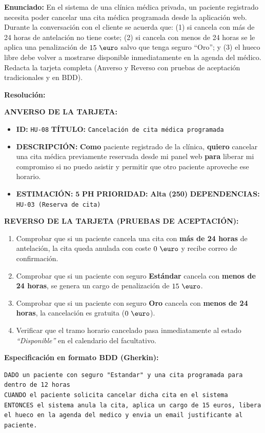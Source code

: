 \begin{ejercicio}
\textbf{Enunciado:} En el sistema de una clínica médica privada, un paciente registrado necesita poder cancelar una cita médica programada desde la aplicación web. Durante la conversación con el cliente se acuerda que: (1) si cancela con más de 24 horas de antelación no tiene coste; (2) si cancela con menos de 24 horas se le aplica una penalización de $15\text{ \euro}$ salvo que tenga seguro ``Oro''; y (3) el hueco libre debe volver a mostrarse disponible inmediatamente en la agenda del médico. Redacta la tarjeta completa (Anverso y Reverso con pruebas de aceptación tradicionales y en BDD).

\vspace{4pt}
\textbf{Resolución:}
\begin{tarjetahu}
\textbf{ANVERSO DE LA TARJETA:}
\begin{itemize}[itemsep=1pt]
    \item \textbf{ID:} \texttt{HU-08} \hfill \textbf{TÍTULO:} \texttt{Cancelación de cita médica programada}
    \item \textbf{DESCRIPCIÓN:} \textbf{Como} paciente registrado de la clínica, \textbf{quiero} cancelar una cita médica previamente reservada desde mi panel web \textbf{para} liberar mi compromiso si no puedo asistir y permitir que otro paciente aproveche ese horario.
    \item \textbf{ESTIMACIÓN:} $\mathbf{5\text{ PH}}$ \hfill \textbf{PRIORIDAD:} \textbf{Alta (250)} \hfill \textbf{DEPENDENCIAS:} \texttt{HU-03 (Reserva de cita)}
\end{itemize}
\tcbline
\textbf{REVERSO DE LA TARJETA (PRUEBAS DE ACEPTACIÓN):}
\begin{enumerate}[label=\textbf{\arabic*.}, itemsep=2pt]
    \item Comprobar que si un paciente cancela una cita con \textbf{más de 24 horas} de antelación, la cita queda anulada con coste $0\text{ \euro}$ y recibe correo de confirmación.
    \item Comprobar que si un paciente con seguro \textbf{Estándar} cancela con \textbf{menos de 24 horas}, se genera un cargo de penalización de $15\text{ \euro}$.
    \item Comprobar que si un paciente con seguro \textbf{Oro} cancela con \textbf{menos de 24 horas}, la cancelación es gratuita ($0\text{ \euro}$).
    \item Verificar que el tramo horario cancelado pasa inmediatamente al estado \textit{``Disponible''} en el calendario del facultativo.
\end{enumerate}
\textbf{Especificación en formato BDD (Gherkin):}
\begin{lstlisting}
DADO un paciente con seguro "Estandar" y una cita programada para dentro de 12 horas
CUANDO el paciente solicita cancelar dicha cita en el sistema
ENTONCES el sistema anula la cita, aplica un cargo de 15 euros, libera el hueco en la agenda del medico y envia un email justificante al paciente.
\end{lstlisting}
\end{tarjetahu}
\end{ejercicio}

